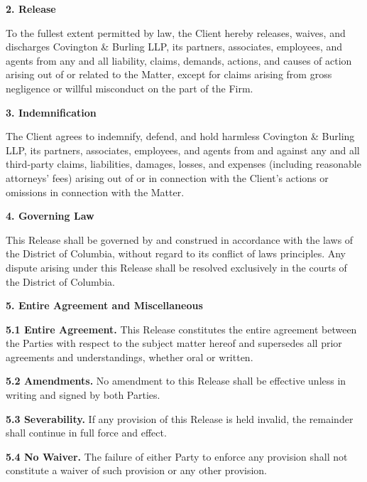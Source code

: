 \documentclass[11pt,letterpaper]{article}
\begin{document}
\vspace{0.3cm}
\noindent \textcolor{DarkNavy}{\large \textbf{2. Release}}

\noindent To the fullest extent permitted by law, the Client hereby releases,
waives, and discharges Covington \& Burling LLP, its partners, associates,
employees, and agents from any and all liability, claims, demands, actions, and
causes of action arising out of or related to the Matter, except for claims
arising from gross negligence or willful misconduct on the part of the Firm.

\vspace{0.3cm}
\noindent \textcolor{DarkNavy}{\large \textbf{3. Indemnification}}

\noindent The Client agrees to indemnify, defend, and hold harmless
Covington \& Burling LLP, its partners, associates, employees, and agents from
and against any and all third-party claims, liabilities, damages, losses, and
expenses (including reasonable attorneys' fees) arising out of or in connection
with the Client's actions or omissions in connection with the Matter.

\vspace{0.3cm}
\noindent \textcolor{DarkNavy}{\large \textbf{4. Governing Law}}

\noindent This Release shall be governed by and construed in accordance with
the laws of the District of Columbia, without regard to its conflict of laws
principles. Any dispute arising under this Release shall be resolved exclusively
in the courts of the District of Columbia.

\vspace{0.3cm}
\noindent \textcolor{DarkNavy}{\large \textbf{5. Entire Agreement and Miscellaneous}}

\noindent \textbf{5.1 Entire Agreement.} This Release constitutes the entire
agreement between the Parties with respect to the subject matter hereof and
supersedes all prior agreements and understandings, whether oral or written.

\noindent \textbf{5.2 Amendments.} No amendment to this Release shall be
effective unless in writing and signed by both Parties.

\noindent \textbf{5.3 Severability.} If any provision of this Release is held
invalid, the remainder shall continue in full force and effect.

\noindent \textbf{5.4 No Waiver.} The failure of either Party to enforce any
provision shall not constitute a waiver of such provision or any other
provision.
\end{document}
